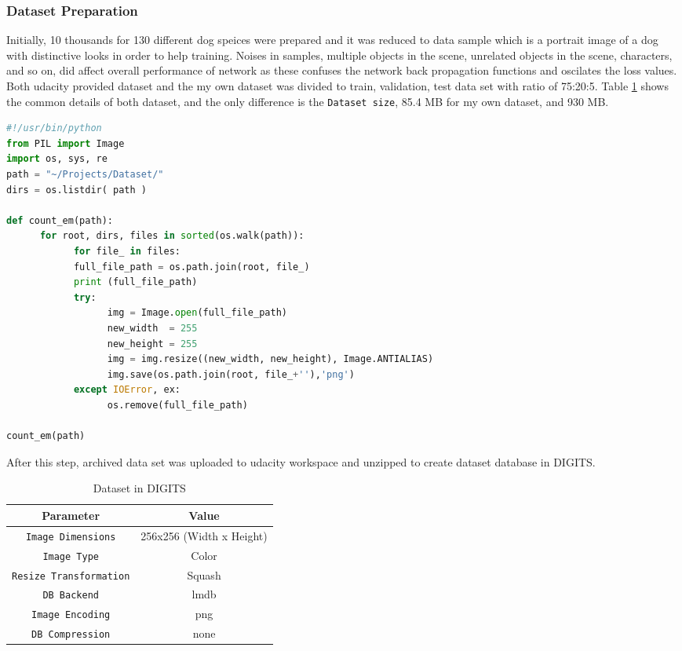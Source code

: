 \documentclass[10pt,journal,compsoc]{IEEEtran}
\begin{document}
\subsubsection{Dataset Preparation}
Initially, 10 thousands for 130 different dog speices were prepared and it was reduced to data sample which is a portrait image of a dog with distinctive looks in order to help training. Noises in samples, multiple objects in the scene, unrelated objects in the scene, characters, and so on, did affect overall performance of network as these confuses the network back propagation functions and oscilates the loss values.
Both udacity provided dataset and the my own dataset was divided to train, validation, test data set with ratio of 75:20:5. Table  \ref{table:CustomDatasetInfo} shows the common details of both dataset, and the only difference is the \verb!Dataset size!, 85.4 MB for my own dataset, and 930 MB.

\begin{lstlisting}[language=Python, caption={Python script to resize and rename the file and directory name of dataset},label={list:RenameResizeDataSet}]
#!/usr/bin/python
from PIL import Image
import os, sys, re
path = "~/Projects/Dataset/"
dirs = os.listdir( path )

def count_em(path):
      for root, dirs, files in sorted(os.walk(path)):
            for file_ in files:
            full_file_path = os.path.join(root, file_)
            print (full_file_path)
            try:
                  img = Image.open(full_file_path)
                  new_width  = 255 
                  new_height = 255
                  img = img.resize((new_width, new_height), Image.ANTIALIAS)
                  img.save(os.path.join(root, file_+''),'png')
            except IOError, ex:
                  os.remove(full_file_path)

count_em(path)      
\end{lstlisting}
After this step, archived data set was uploaded to udacity workspace and unzipped to create dataset database in DIGITS.

\begin{table}[ht]
      \caption{Dataset in DIGITS}
      \label{table:CustomDatasetInfo}
      \begin{center}
      \begin{tabular}{|c|c|}
      \hline
      Parameter & Value \\
      \hline\hline
      \verb!Image Dimensions! & 256x256 (Width x Height)\\
      \hline
      \verb!Image Type! & Color\\
      \hline
      \verb!Resize Transformation! & Squash\\
      \hline
      \verb!DB Backend! & lmdb\\
      \hline
      \verb!Image Encoding! & png\\
      \hline
      \verb!DB Compression! & none\\
      \hline
      \end{tabular}
      \end{center}
\end{table}
\end{document}
